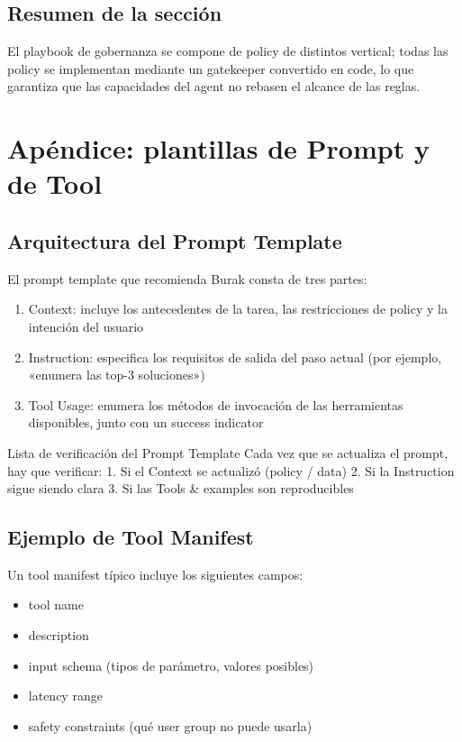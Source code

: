 \documentclass[a4paper]{article}
\begin{document}
\subsection{Resumen de la sección}

El playbook de gobernanza se compone de policy de distintos vertical; todas las policy se implementan mediante un gatekeeper convertido en code, lo que garantiza que las capacidades del agent no rebasen el alcance de las reglas.
\section{Apéndice: plantillas de Prompt y de Tool}

\subsection{Arquitectura del Prompt Template}

El prompt template que recomienda Burak consta de tres partes:

\begin{enumerate}
    \item Context: incluye los antecedentes de la tarea, las restricciones de policy y la intención del usuario
    \item Instruction: especifica los requisitos de salida del paso actual (por ejemplo, «enumera las top-3 soluciones»)
    \item Tool Usage: enumera los métodos de invocación de las herramientas disponibles, junto con un success indicator
\end{enumerate}

\begin{knowledgebox}{Lista de verificación del Prompt Template}
Cada vez que se actualiza el prompt, hay que verificar:
1. Si el Context se actualizó (policy / data)
2. Si la Instruction sigue siendo clara
3. Si las Tools \& examples son reproducibles
\end{knowledgebox}

\subsection{Ejemplo de Tool Manifest}

Un tool manifest típico incluye los siguientes campos:

\begin{itemize}
    \item tool name
    \item description
    \item input schema (tipos de parámetro, valores posibles)
    \item latency range
    \item safety constraints (qué user group no puede usarla)
\end{itemize}
\end{document}
